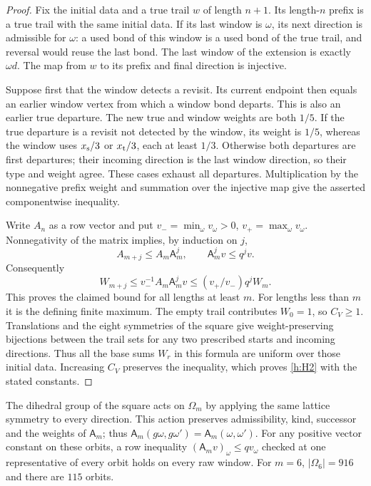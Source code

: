\begin{proof}
Fix the initial data and a true trail \(w\) of length \(n+1\).
Its length-\(n\) prefix is a true trail with the same initial data.
If its last window is \(\omega\), its next direction is admissible
for \(\omega\): a used bond of this window is a used bond of the
true trail, and reversal would reuse the last bond. The last window
of the extension is exactly \(\omega d\). The map from \(w\) to its
prefix and final direction is injective.

Suppose first that the window detects a revisit. Its current endpoint
then equals an earlier window vertex from which a window bond departs.
This is also an earlier true departure. The new true and window
weights are both \(1/5\). If the true departure is a revisit not
detected by the window, its weight is \(1/5\), whereas the window
uses \(x_{\rm s}/3\) or \(x_{\rm t}/3\), each at least \(1/3\).
Otherwise both departures are first departures; their incoming
direction is the last window direction, so their type and weight
agree. These cases exhaust all departures. Multiplication by the
nonnegative prefix weight and summation over the injective map give
the asserted componentwise inequality.

Write \(A_n\) as a row vector and put
\(v_- =\min_\omega v_\omega>0\),
\(v_+=\max_\omega v_\omega\). Nonnegativity of the matrix implies,
by induction on \(j\),
\[
 A_{m+j}\le A_m\mathsf A_m^j,\qquad
 \mathsf A_m^jv\le q^jv .
\]
Consequently
\[
 W_{m+j}\le v_-^{-1}A_m\mathsf A_m^jv
       \le (v_+/v_-)q^jW_m .
\]
This proves the claimed bound for all lengths at least \(m\).
For lengths less than \(m\) it is the defining finite maximum.
The empty trail contributes \(W_0=1\), so \(C_V\ge1\).
Translations and the eight symmetries of the square give
weight-preserving bijections between the trail sets for any two
prescribed starts and incoming directions. Thus all the base sums
\(W_r\) in this formula are uniform over those initial data.
Increasing \(C_V\) preserves the inequality, which proves
\ref{h:H2} with the stated constants.
\end{proof}

\begin{lemma}\label{l:H2-dihedral}
The dihedral group of the square acts on \(\Omega_m\) by applying
the same lattice symmetry to every direction. This action preserves
admissibility, kind, successor and the weights of \(\mathsf A_m\);
thus \(\mathsf A_m(g\omega,g\omega')=\mathsf A_m(\omega,\omega')\).
For any positive vector constant on these orbits, a row inequality
\((\mathsf A_mv)_\omega\le qv_\omega\) checked at one representative
of every orbit holds on every raw window.
For \(m=6\), \(|\Omega_6|=916\) and there are \(115\) orbits.
\end{lemma}

